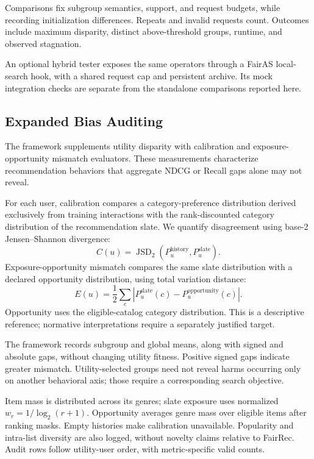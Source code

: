\documentclass[sigconf,nonacm]{acmart}
\begin{document}
Comparisons fix subgroup semantics, support, and request budgets, while recording initialization differences. Repeats and invalid requests count. Outcomes include maximum disparity, distinct above-threshold groups, runtime, and observed stagnation.

An optional hybrid tester exposes the same operators through a FairAS local-search hook, with a shared request cap and persistent archive. Its mock integration checks are separate from the standalone comparisons reported here.

\subsection{Expanded Bias Auditing}
The framework supplements utility disparity with calibration and exposure-opportunity mismatch evaluators. These measurements characterize recommendation behaviors that aggregate NDCG or Recall gaps alone may not reveal.

For each user, calibration compares a category-preference distribution derived exclusively from training interactions with the rank-discounted category distribution of the recommendation slate. We quantify disagreement using base-2 Jensen--Shannon divergence:
\begin{equation}
\label{eq:calibration}
C(u)=\operatorname{JSD}_{2}\!\left(P_u^{\mathrm{history}},P_u^{\mathrm{slate}}\right).
\end{equation}
Exposure-opportunity mismatch compares the same slate distribution with a declared opportunity distribution, using total variation distance:
\begin{equation}
\label{eq:exposure}
E(u)=\frac{1}{2}\sum_c\left|P_u^{\mathrm{slate}}(c)-P_u^{\mathrm{opportunity}}(c)\right|.
\end{equation}
Opportunity uses the eligible-catalog category distribution. This is a descriptive reference; normative interpretations require a separately justified target.

The framework records subgroup and global means, along with signed and absolute gaps, without changing utility fitness. Positive signed gaps indicate greater mismatch. Utility-selected groups need not reveal harms occurring only on another behavioral axis; those require a corresponding search objective.


Item mass is distributed across its genres; slate exposure uses normalized $w_r=1/\log_2(r+1)$. Opportunity averages genre mass over eligible items after ranking masks. Empty histories make calibration unavailable. Popularity and intra-list diversity are also logged, without novelty claims relative to FairRec. Audit rows follow utility-user order, with metric-specific valid counts.
\end{document}
